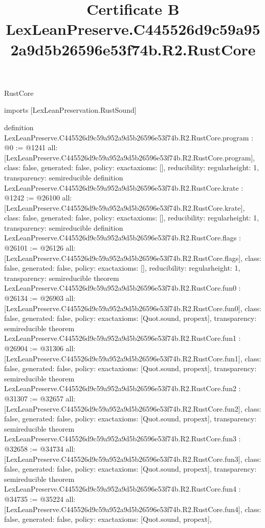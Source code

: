 \begin{lexlean}{RustCore}
\title{Certificate B LexLeanPreserve.C445526d9c59a952a9d5b26596e53f74b.R2.RustCore}
\begin{coremodule}
imports [LexLeanPreservation.RustSound]

definition LexLeanPreserve.C445526d9c59a952a9d5b26596e53f74b.R2.RustCore.program : @0 := @1241 {
  all: [LexLeanPreserve.C445526d9c59a952a9d5b26596e53f74b.R2.RustCore.program],
  class: false,
  generated: false,
  policy: exact{axioms: []},
  reducibility: regular{height: 1},
  transparency: semireducible
}
definition LexLeanPreserve.C445526d9c59a952a9d5b26596e53f74b.R2.RustCore.krate : @1242 := @26100 {
  all: [LexLeanPreserve.C445526d9c59a952a9d5b26596e53f74b.R2.RustCore.krate],
  class: false,
  generated: false,
  policy: exact{axioms: []},
  reducibility: regular{height: 1},
  transparency: semireducible
}
definition LexLeanPreserve.C445526d9c59a952a9d5b26596e53f74b.R2.RustCore.flags : @26101 := @26126 {
  all: [LexLeanPreserve.C445526d9c59a952a9d5b26596e53f74b.R2.RustCore.flags],
  class: false,
  generated: false,
  policy: exact{axioms: []},
  reducibility: regular{height: 1},
  transparency: semireducible
}
theorem LexLeanPreserve.C445526d9c59a952a9d5b26596e53f74b.R2.RustCore.fun0 : @26134 := @26903 {
  all: [LexLeanPreserve.C445526d9c59a952a9d5b26596e53f74b.R2.RustCore.fun0],
  class: false,
  generated: false,
  policy: exact{axioms: [Quot.sound, propext]},
  transparency: semireducible
}
theorem LexLeanPreserve.C445526d9c59a952a9d5b26596e53f74b.R2.RustCore.fun1 : @26904 := @31306 {
  all: [LexLeanPreserve.C445526d9c59a952a9d5b26596e53f74b.R2.RustCore.fun1],
  class: false,
  generated: false,
  policy: exact{axioms: [Quot.sound, propext]},
  transparency: semireducible
}
theorem LexLeanPreserve.C445526d9c59a952a9d5b26596e53f74b.R2.RustCore.fun2 : @31307 := @32657 {
  all: [LexLeanPreserve.C445526d9c59a952a9d5b26596e53f74b.R2.RustCore.fun2],
  class: false,
  generated: false,
  policy: exact{axioms: [Quot.sound, propext]},
  transparency: semireducible
}
theorem LexLeanPreserve.C445526d9c59a952a9d5b26596e53f74b.R2.RustCore.fun3 : @32658 := @34734 {
  all: [LexLeanPreserve.C445526d9c59a952a9d5b26596e53f74b.R2.RustCore.fun3],
  class: false,
  generated: false,
  policy: exact{axioms: [Quot.sound, propext]},
  transparency: semireducible
}
theorem LexLeanPreserve.C445526d9c59a952a9d5b26596e53f74b.R2.RustCore.fun4 : @34735 := @35224 {
  all: [LexLeanPreserve.C445526d9c59a952a9d5b26596e53f74b.R2.RustCore.fun4],
  class: false,
  generated: false,
  policy: exact{axioms: [Quot.sound, propext]},
}
\end{coremodule}
\end{lexlean}
